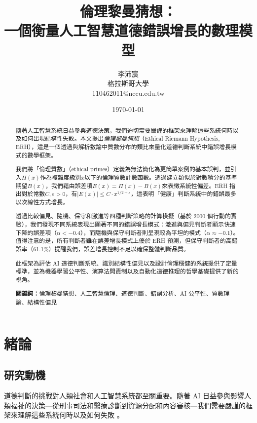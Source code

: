 \documentclass[12pt,a4paper]{article}
\title{倫理黎曼猜想：\\
       一個衡量人工智慧道德錯誤增長的數理模型}
\author{李沛宸 \\
        格拉斯哥大學 \\
        110462011@nccu.edu.tw}
\date{\today}
\theoremstyle{definition}
\theoremstyle{remark}
\begin{document}
\maketitle

\begin{abstract}
隨著人工智慧系統日益參與道德決策，我們迫切需要嚴謹的框架來理解這些系統何時以及如何出現結構性失敗。本文提出\emph{倫理黎曼猜想}（Ethical Riemann Hypothesis, ERH），這是一個透過與解析數論中質數分布的類比來量化道德判斷系統中錯誤增長模式的數學框架。

我們將「倫理質數」（ethical primes）定義為無法簡化為更簡單案例的基本誤判，並引入$\Pi(x)$作為複雜度級別$x$以下的倫理質數計數函數。透過建立類似於對數積分的基準期望$B(x)$，我們藉由誤差項$E(x) = \Pi(x) - B(x)$來表徵系統性偏差。ERH 指出對於常數$C, \varepsilon > 0$，有$|E(x)| \leq C \cdot x^{1/2 + \varepsilon}$，這表明「健康」判斷系統中的錯誤最多以次線性方式增長。

透過比較偏見、隨機、保守和激進等四種判斷策略的計算模擬（基於 2000 個行動的實驗），我們發現不同系統表現出顯著不同的錯誤增長模式：激進與偏見判斷者顯示快速下降的誤差項（$\alpha < -0.4$），而隨機與保守判斷者則呈現較為平坦的模式（$\alpha \approx -0.1$）。值得注意的是，所有判斷者雖在誤差增長模式上優於 ERH 預測，但保守判斷者的高錯誤率（61.1\%）提醒我們，誤差增長控制不足以確保整體判斷品質。

此框架為評估 AI 道德判斷系統、識別結構性偏見以及設計倫理穩健的系統提供了定量標準，並為機器學習公平性、演算法問責制以及自動化道德推理的哲學基礎提供了新的視角。

\textbf{關鍵詞：}倫理黎曼猜想、人工智慧倫理、道德判斷、錯誤分析、AI 公平性、質數理論、結構性偏見
\end{abstract}

\section{緒論}
\label{sec:introduction}

\subsection{研究動機}

道德判斷的挑戰對人類社會和人工智慧系統都至關重要。隨著 AI 日益參與影響人類福祉的決策---從刑事司法和醫療診斷到資源分配和內容審核---我們需要嚴謹的框架來理解這些系統何時以及如何失敗 \citep{jobin2019,floridi2018}。
\end{document}
